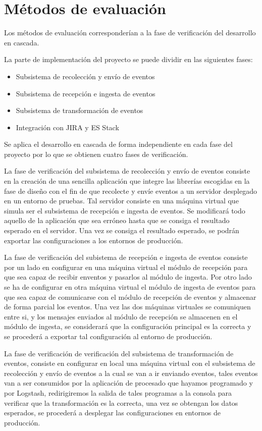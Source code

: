 \section{Métodos de evaluación}

Los métodos de evaluación corresponderían a la fase de verificación del desarrollo en cascada.

La parte de implementación del proyecto se puede dividir en las siguientes fases:

\begin{itemize}
	\item Subsistema de recolección y envío de eventos
	\item Subsistema de recepción e ingesta de eventos
 	\item Subsistema de transformación de eventos
	\item Integración con JIRA y ES Stack
\end{itemize}

Se aplica el desarrollo en cascada de forma independiente en cada fase del proyecto por lo que se obtienen cuatro fases de verificación.

La fase de verificación del subsistema de recolección y envío de eventos consiste en la creación de una sencilla aplicación que integre las librerías escogidas en la fase de diseño con el fin de que recolecte y envíe eventos a un servidor desplegado en un entorno de pruebas. Tal servidor consiste en una máquina virtual que simula ser el subsistema de recepción e ingesta de eventos. Se modificará todo aquello de la aplicación que sea erróneo hasta que se consiga el resultado esperado en el servidor. Una vez se consiga el resultado esperado, se podrán exportar las configuraciones a los entornos de producción.

La fase de verificación del subistema de recepción e ingesta de eventos consiste por un lado en configurar en una máquina virtual el módulo de recepción para que sea capaz de recibir enventos y pasarlos al módulo de ingesta. Por otro lado se ha de configurar en otra máquina virtual el módulo de ingesta de eventos para que sea capaz de comunicarse con el módulo de recepción de eventos y almacenar de forma parcial los eventos. Una vez las dos máquinas virtuales se comuniquen entre si, y los mensajes enviados al módulo de recepción se almacenen en el módulo de ingesta, se considerará que la configuración principal es la correcta y se procederá a exportar tal configuración al entorno de producción.

La fase de verificación de verificación del subsistema de transformación de eventos, consiste en configurar en local una máquina virtual con el subsistema de recolección y envío de eventos a la cual se van a ir enviando eventos, tales eventos van a ser consumidos por la aplicación de procesado que hayamos programado y por Logstash, redirigiremos la salida de tales programas a la consola para verificar que la transformación es la correcta, una vez se obtengan los datos esperados, se procederá a desplegar las configuraciones en entornos de producción.

